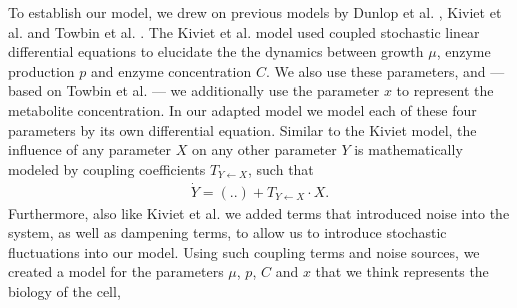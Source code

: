 
%
To establish our model, we drew on previous models by Dunlop et al. \cite{Dunlop2008}, Kiviet et al. \cite{Kiviet2014} and Towbin et al. \cite{Towbin2017}.
%
The Kiviet et al. model used coupled stochastic linear differential equations to elucidate the the dynamics between growth $\mu$, enzyme production $p$ and enzyme concentration $C$. %
%
We also use these parameters, and --- based on Towbin et al. --- we additionally use the parameter $x$ to represent the metabolite concentration. 
%
In our adapted model we 
model each of these four parameters by its own differential equation.
%
Similar to the Kiviet model, the influence of any parameter $X$ on any other parameter $Y$ is mathematically modeled by coupling coefficients $T_{{Y}\leftarrow{X}}$, such that 
\begin{align*}
	\dot{Y} = (..) + T_{{Y}\leftarrow{X}} \cdot X
	.
\end{align*}
%
Furthermore, also like Kiviet et al. we added terms that introduced noise into the system, as well as dampening terms, to allow us to introduce stochastic fluctuations into our model.
Using such coupling terms and noise sources, 
we created a model for the parameters $\mu$, $p$, $C$ and $x$ that we think represents the biology of the cell, 
